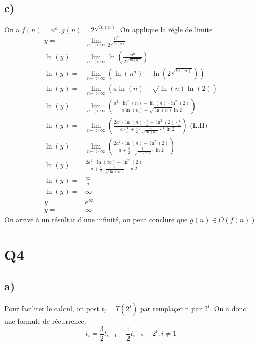 \documentclass[10pt,a4paper]{article}
\begin{document}
\subsection{c)}
On a $f(n) = n^a, g(n) = 2^{\sqrt{ln(n)}}$. On applique la règle de limite
\begin{align*}
    y =& \lim_{n->\infty} \frac{n^a}{2^{\sqrt{ln(n)}}} \\
    \ln(y) =& \lim_{n->\infty} \ln \left( \frac{n^a}{2^{\sqrt{ln(n)}}} \right) \\
    \ln(y) =& \lim_{n->\infty} \left( \ln(n^a) - \ln(2^{\sqrt{ln(n)}})\right) \\
    \ln(y) =& \lim_{n->\infty} \left( a\ln(n) - \sqrt{\ln(n)}\ln(2)\right) \\
    \ln(y) =& \lim_{n->\infty} \left( \frac{a^2\cdot \ln^2(n) - \ln(n)\cdot \ln^2(2)}{a\ln(n) + \sqrt{\ln(n)}\ln 2} \right) \\
     \ln(y) =& \lim_{n->\infty} \left(  \frac{2a^2\cdot \ln(n) \cdot \frac{1}{n} - \ln^2(2) \cdot \frac{1}{n}}{a \cdot \frac{1}{n} + \frac{1}{2} \cdot \frac{1}{\sqrt{\ln(n)}} \cdot \frac{1}{n}\ln 2} \right) \text{ (L.H)} \\
     \ln(y) =& \lim_{n->\infty} \left(  \frac{2a^2\cdot \ln(n)- \ln^2(2)}{a + \frac{1}{2} \cdot \frac{1}{\sqrt{\ln(n)}} \cdot \ln 2} \right) \\
     \ln(y) =&   \frac{2a^2\cdot \ln(\infty)- \ln^2(2)}{a + \frac{1}{2} \cdot \frac{1}{\sqrt{\ln(\infty)}} \cdot \ln 2}  \\
     \ln(y) =& \frac{\infty}{a} \\
     \ln(y) =& \infty \\
     y =& e^\infty \\
     y =& \infty
\end{align*}
On arrive à un résultat d'une infinité, on peut conclure que $g(n) \in O(f(n))$
\newpage
\section{Q4}
\subsection{a)}

Pour faciliter le calcul, on post $t_i = T(2^i)$ par remplaçer n par $2^i$. On a donc une formule de récurrence:
\begin{equation*}
    t_i = \frac{3}{2}t_{i-1} - \frac{1}{2}t_{i-2} + 2^{i}, i \neq 1
\end{equation*}
\end{document}
